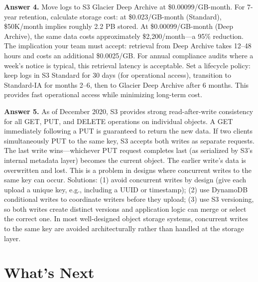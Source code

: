\documentclass[11pt,a4paper]{article}
\begin{document}
\begin{answerbox}
\medskip
\textbf{Answer 4.} Move logs to S3 Glacier Deep Archive at \$0.00099/GB-month. For 7-year retention, calculate storage cost: at \$0.023/GB-month (Standard), \$50K/month implies roughly 2.2 PB stored. At \$0.00099/GB-month (Deep Archive), the same data costs approximately \$2,200/month---a 95\% reduction. The implication your team must accept: retrieval from Deep Archive takes 12--48 hours and costs an additional \$0.0025/GB. For annual compliance audits where a week's notice is typical, this retrieval latency is acceptable. Set a lifecycle policy: keep logs in S3 Standard for 30 days (for operational access), transition to Standard-IA for months 2--6, then to Glacier Deep Archive after 6 months. This provides fast operational access while minimizing long-term cost.

\medskip
\textbf{Answer 5.} As of December 2020, S3 provides strong read-after-write consistency for all GET, PUT, and DELETE operations on individual objects. A GET immediately following a PUT is guaranteed to return the new data. If two clients simultaneously PUT to the same key, S3 accepts both writes as separate requests. The last write wins---whichever PUT request completes last (as serialized by S3's internal metadata layer) becomes the current object. The earlier write's data is overwritten and lost. This is a problem in designs where concurrent writes to the same key can occur. Solutions: (1) avoid concurrent writes by design (give each upload a unique key, e.g., including a UUID or timestamp); (2) use DynamoDB conditional writes to coordinate writers before they upload; (3) use S3 versioning, so both writes create distinct versions and application logic can merge or select the correct one. In most well-designed object storage systems, concurrent writes to the same key are avoided architecturally rather than handled at the storage layer.

\end{answerbox}

\section{What's Next}
\end{document}
